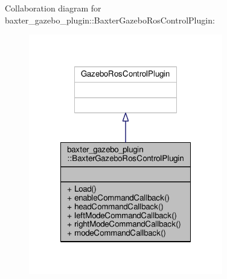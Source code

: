 Collaboration diagram for baxter\-\_\-gazebo\-\_\-plugin\-:\-:Baxter\-Gazebo\-Ros\-Control\-Plugin\-:
\nopagebreak
\begin{figure}[H]
\begin{center}
\leavevmode
\includegraphics[width=240pt]{classbaxter__gazebo__plugin_1_1_baxter_gazebo_ros_control_plugin__coll__graph}
\end{center}
\end{figure}
